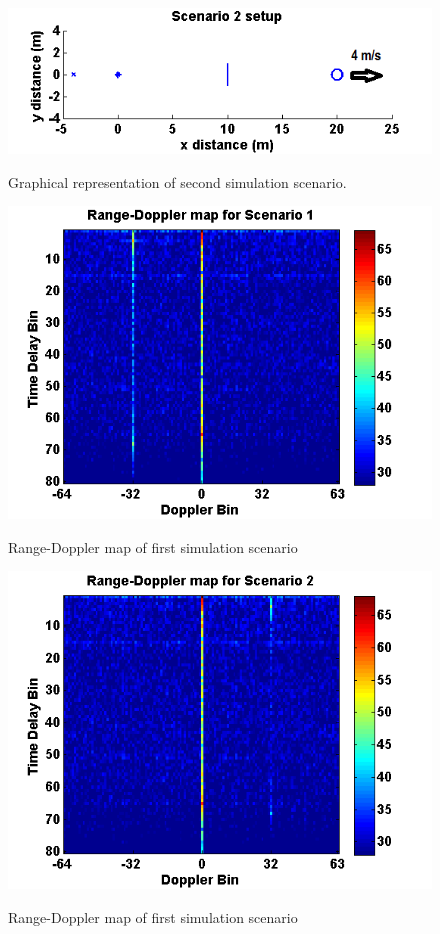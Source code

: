 \documentclass[article,11pt,onecolumn,final]{IEEEtran}
\begin{document}
\begin{figure}[H]
	\caption{Graphical representation of second simulation scenario.}
	\centering
	\includegraphics[width=400pt]{figures/sim2.png}
	\label{fig:sim2}
\end{figure}

\begin{figure}[H]
	\caption{Range-Doppler map of first simulation scenario}
	\centering
	\includegraphics[width=400pt]{figures/rdm1.png}
	\label{fig:rdm1}
\end{figure}

\begin{figure}[H]
	\caption{Range-Doppler map of first simulation scenario}
	\centering
	\includegraphics[width=400pt]{figures/rdm2.png}
	\label{fig:rdm2}
\end{figure}
\end{document}
